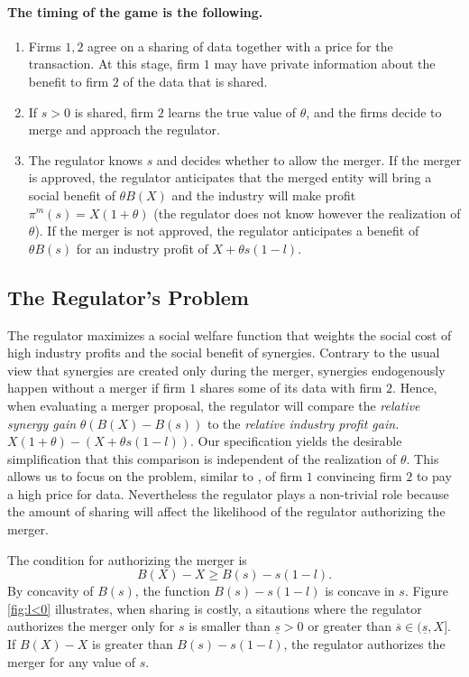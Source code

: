 \documentclass[a4paper]{article}
\renewcommand{\t}{\theta}
\begin{document}
\paragraph{The timing of the game is the following.} 
\begin{enumerate}\setlength\itemsep{0em}
    \item Firms $1,2$ agree on a sharing of data together with a price for the transaction. At this stage, firm $1$ may have private information about the benefit to firm $2$ of the data that is shared. 
    \item If $s>0$ is shared, firm $2$ learns the true value of $\t$, and the firms decide to merge and approach the regulator.
    \item The regulator knows $s$ and decides whether to allow the merger. If the merger is approved, the regulator anticipates that the merged entity will bring a social benefit of $\t B(X)$ and the industry will make profit $\pi^m(s)=X(1+\t)$ (the regulator does not know however the realization of $\t$). If the merger is not approved, the regulator anticipates a benefit of $\t B(s)$ for an industry profit of $X+\t s(1-l)$.
\end{enumerate}
%
\subsection{The Regulator's Problem}
   The regulator maximizes a social welfare function that weights the social cost of high industry profits and the social benefit of synergies. Contrary to the usual view that synergies are created only during the merger, synergies endogenously happen without a merger if firm $1$ shares some of its data with firm $2$. Hence, when evaluating a merger proposal, the regulator will compare the \emph{relative synergy gain} $\t (B(X)-B(s))$ to the \emph{relative industry profit gain.} $X(1+\t)-(X+\t s(1-l))$. Our specification yields  the desirable simplification that this comparison is independent of the realization of $\t$. This allows us to focus on the problem, similar to \cite{anton2002sale}, of firm $1$ convincing firm $2$ to pay a high price for data. Nevertheless the regulator plays a non-trivial role because the amount of sharing will affect the likelihood of the regulator authorizing the merger. 

   The condition for authorizing the merger is 
   \[
   B(X)-X\geq B(s)-s(1-l).
   \]
By concavity of $B(s)$, the function $B(s)-s(1-l)$ is concave in $s$. Figure \ref{fig:l<0} illustrates, when sharing is costly, a sitautions where the regulator authorizes the merger only for $s$ is smaller than $\underline s>0$ or greater than $\overline s\in(\underline s,X]$. If $B(X)-X$ is greater than $B(s)-s(1-l)$, the regulator authorizes the merger for any value of $s$. 
\end{document}
